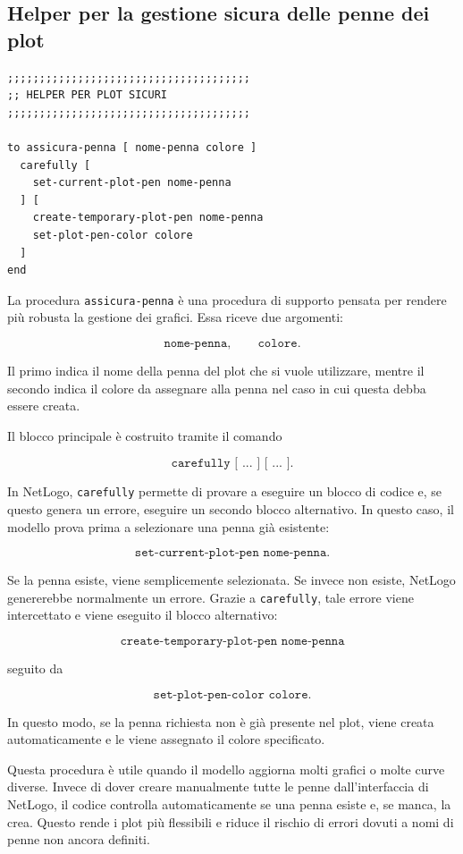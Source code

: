 \subsection{Helper per la gestione sicura delle penne dei plot}

\begin{lstlisting}[caption={Procedura di controllo e creazione delle penne dei plot}]
;;;;;;;;;;;;;;;;;;;;;;;;;;;;;;;;;;;;;;
;; HELPER PER PLOT SICURI
;;;;;;;;;;;;;;;;;;;;;;;;;;;;;;;;;;;;;;

to assicura-penna [ nome-penna colore ]
  carefully [
    set-current-plot-pen nome-penna
  ] [
    create-temporary-plot-pen nome-penna
    set-plot-pen-color colore
  ]
end
\end{lstlisting}

La procedura \texttt{assicura-penna} è una procedura di supporto pensata per
rendere più robusta la gestione dei grafici. Essa riceve due argomenti:

\[
\texttt{nome-penna},
\qquad
\texttt{colore}.
\]

Il primo indica il nome della penna del plot che si vuole utilizzare, mentre il
secondo indica il colore da assegnare alla penna nel caso in cui questa debba
essere creata.

Il blocco principale è costruito tramite il comando

\[
\texttt{carefully [ ... ] [ ... ]}.
\]

In NetLogo, \texttt{carefully} permette di provare a eseguire un blocco di
codice e, se questo genera un errore, eseguire un secondo blocco alternativo.
In questo caso, il modello prova prima a selezionare una penna già esistente:

\[
\texttt{set-current-plot-pen nome-penna}.
\]

Se la penna esiste, viene semplicemente selezionata. Se invece non esiste,
NetLogo genererebbe normalmente un errore. Grazie a \texttt{carefully}, tale
errore viene intercettato e viene eseguito il blocco alternativo:

\[
\texttt{create-temporary-plot-pen nome-penna}
\]

seguito da

\[
\texttt{set-plot-pen-color colore}.
\]

In questo modo, se la penna richiesta non è già presente nel plot, viene creata
automaticamente e le viene assegnato il colore specificato.

Questa procedura è utile quando il modello aggiorna molti grafici o molte curve
diverse. Invece di dover creare manualmente tutte le penne dall'interfaccia di
NetLogo, il codice controlla automaticamente se una penna esiste e, se manca, la
crea. Questo rende i plot più flessibili e riduce il rischio di errori dovuti a
nomi di penne non ancora definiti.


